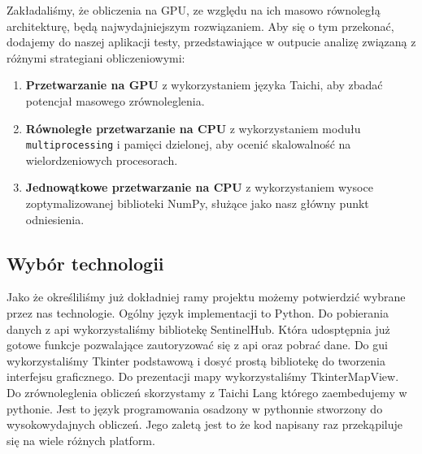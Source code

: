 \documentclass[12pt,a4paper]{article}
\begin{document}
Zakładaliśmy, że obliczenia na GPU, ze względu na ich masowo równoległą architekturę, będą najwydajniejszym rozwiązaniem. Aby się o tym przekonać, dodajemy do naszej aplikacji testy, przedstawiające w outpucie analizę związaną z różnymi strategiani obliczeniowymi:
\begin{enumerate}
    \item \textbf{Przetwarzanie na GPU} z wykorzystaniem języka Taichi, aby zbadać potencjał masowego zrównoleglenia.
    \item \textbf{Równoległe przetwarzanie na CPU} z wykorzystaniem modułu \texttt{multiprocessing} i pamięci dzielonej, aby ocenić skalowalność na wielordzeniowych procesorach.
    \item \textbf{Jednowątkowe przetwarzanie na CPU} z wykorzystaniem wysoce zoptymalizowanej biblioteki NumPy, służące jako nasz główny punkt odniesienia.
\end{enumerate}

\subsection{Wybór technologii}

Jako że określiliśmy już dokładniej ramy projektu możemy potwierdzić wybrane przez nas technologie. 
Ogólny język implementacji to Python.
Do pobierania danych z api wykorzystaliśmy bibliotekę SentinelHub. Która udosptępnia już gotowe funkcje pozwalające zautoryzować się z api oraz pobrać dane.
Do gui wykorzystaliśmy Tkinter podstawową i dosyć prostą bibliotekę do tworzenia interfejsu graficznego.
Do prezentacji mapy wykorzystaliśmy TkinterMapView.
Do zrównoleglenia obliczeń skorzystamy z Taichi Lang \cite{taichi_lang_docs} którego zaembedujemy w pythonie.
Jest to język programowania osadzony w pythonnie stworzony do wysokowydajnych obliczeń.
Jego zaletą jest to że kod napisany raz przekąpiluje się na wiele różnych platform.

\newpage
\end{document}
